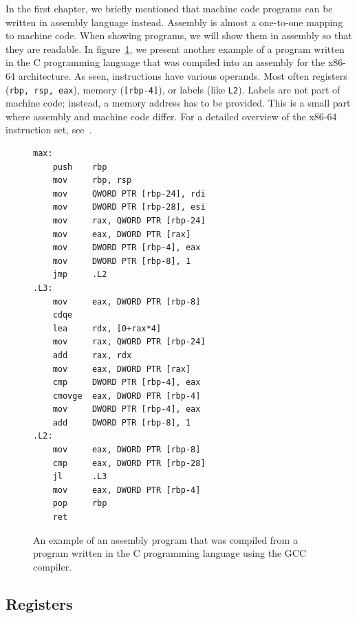 In the first chapter, we briefly mentioned that machine code programs can be
written in assembly language instead. Assembly is almost a one-to-one mapping
to machine code. When showing programs, we will show them in assembly so that
they are readable. In figure~\ref{fig:assembly-example2}, we present another
example of a program written in the C programming language that was compiled
into an assembly for the x86-64 architecture. As seen, instructions have
various operands. Most often registers (\texttt{rbp, rsp, eax}), memory
(\texttt{[rbp-4]}), or labels (like \texttt{L2}). Labels are not part of
machine code; instead, a memory address has to be provided. This is a small
part where assembly and machine code differ. For a detailed overview of the
x86-64 instruction set, see~\cite{intel-manual}.

\begin{figure}
    \begin{lstlisting}
max:
    push    rbp
    mov     rbp, rsp
    mov     QWORD PTR [rbp-24], rdi
    mov     DWORD PTR [rbp-28], esi
    mov     rax, QWORD PTR [rbp-24]
    mov     eax, DWORD PTR [rax]
    mov     DWORD PTR [rbp-4], eax
    mov     DWORD PTR [rbp-8], 1
    jmp     .L2
.L3:
    mov     eax, DWORD PTR [rbp-8]
    cdqe
    lea     rdx, [0+rax*4]
    mov     rax, QWORD PTR [rbp-24]
    add     rax, rdx
    mov     eax, DWORD PTR [rax]
    cmp     DWORD PTR [rbp-4], eax
    cmovge  eax, DWORD PTR [rbp-4]
    mov     DWORD PTR [rbp-4], eax
    add     DWORD PTR [rbp-8], 1
.L2:
    mov     eax, DWORD PTR [rbp-8]
    cmp     eax, DWORD PTR [rbp-28]
    jl      .L3
    mov     eax, DWORD PTR [rbp-4]
    pop     rbp
    ret
    \end{lstlisting}
    \caption{An example of an assembly program that was compiled from a program
    written in the C programming language using the GCC compiler.}
    \label{fig:assembly-example2}
\end{figure}

\subsection*{Registers}\label{subsection:registers}

